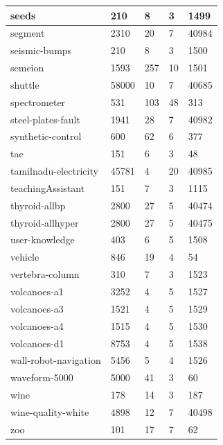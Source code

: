 \documentclass[times,specification,annotation]{itmo-student-thesis}
\begin{document}
\begin{center}
\begin{longtable}{ |m{5cm}|m{2.5cm}|m{2.5cm}|m{2cm}|m{2cm}| }
			\hline
			seeds & 210 & 8 & 3 & 1499 \\
			\hline
			segment & 2310 & 20 & 7 & 40984 \\
			\hline
			seismic-bumps & 210 & 8 & 3 & 1500 \\
			\hline
			semeion & 1593 & 257 & 10 & 1501 \\
			\hline
			shuttle & 58000 & 10 & 7 & 40685 \\
			\hline
			spectrometer & 531 & 103 & 48 & 313 \\
			\hline
			steel-plates-fault & 1941 & 28 & 7 & 40982 \\
			\hline
			synthetic-control & 600 & 62 & 6 & 377 \\
			\hline
			tae & 151 & 6 & 3 & 48 \\
			\hline
			tamilnadu-electricity & 45781 & 4 & 20 & 40985 \\
			\hline
			teachingAssistant & 151 & 7 & 3 & 1115 \\
			\hline
			thyroid-allbp & 2800 & 27 & 5 & 40474 \\
			\hline
			thyroid-allhyper & 2800 & 27 & 5 & 40475 \\
			\hline
			user-knowledge & 403 & 6 & 5 & 1508 \\
			\hline
			vehicle & 846 & 19 & 4 & 54 \\
			\hline
			vertebra-column & 310 & 7 & 3 & 1523 \\
			\hline
			volcanoes-a1 & 3252 & 4 & 5 & 1527 \\
			\hline
			volcanoes-a3 & 1521 & 4 & 5 & 1529 \\
			\hline
			volcanoes-a4 & 1515 & 4 & 5 & 1530 \\
			\hline
			volcanoes-d1 & 8753 & 4 & 5 & 1538 \\
			\hline
			wall-robot-navigation & 5456 & 5 & 4 & 1526 \\
			\hline
			waveform-5000 & 5000 & 41 & 3 & 60 \\
			\hline
			wine & 178 & 14 & 3 & 187 \\
			\hline
			wine-quality-white & 4898 & 12 & 7 & 40498 \\
			\hline
			zoo & 101 & 17 & 7 & 62 \\
			\hline
		\end{longtable}
	\end{center}
	
\end{document}
